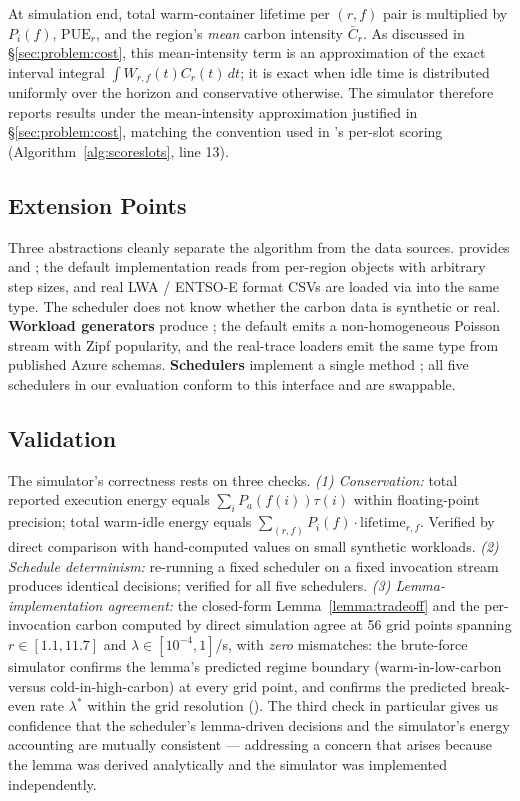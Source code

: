 At simulation end, total warm-container lifetime per $(r, f)$ pair
is multiplied by $P_i(f)$, $\mathrm{PUE}_r$, and the region's
\emph{mean} carbon intensity $\bar{C}_r$. As discussed in
\S\ref{sec:problem:cost}, this mean-intensity term is an
approximation of the exact interval integral
$\int W_{r,f}(t) C_r(t)\,dt$; it is exact when idle time is
distributed uniformly over the horizon and conservative otherwise.
The simulator therefore reports results under the mean-intensity
approximation justified in \S\ref{sec:problem:cost}, matching the
convention used in \GreenFaaS's per-slot scoring
(Algorithm~\ref{alg:scoreslots}, line 13).

\subsection{Extension Points}

Three abstractions cleanly separate the algorithm from the data
sources. \textbf{} provides
 and ;
the default implementation reads from per-region 
objects with arbitrary step sizes, and real LWA / ENTSO-E format CSVs
\citep{lwa} are loaded via  into the same type.
The scheduler does not know whether the carbon data is synthetic or real.
\textbf{Workload generators} produce ; the
default emits a non-homogeneous Poisson stream with Zipf
popularity, and the real-trace loaders emit the same type from
published Azure schemas. \textbf{Schedulers} implement a single
method ;
all five schedulers in our evaluation conform to this interface and
are swappable.

\subsection{Validation}

The simulator's correctness rests on three checks. \emph{(1)
Conservation:} total reported execution energy equals
$\sum_i P_a(f(i)) \tau(i)$ within floating-point precision; total
warm-idle energy equals $\sum_{(r,f)} P_i(f) \cdot
\mathrm{lifetime}_{r,f}$. Verified by direct comparison with
hand-computed values on small synthetic workloads. \emph{(2) Schedule
determinism:} re-running a fixed scheduler on a fixed invocation
stream produces identical decisions; verified for all five
schedulers. \emph{(3) Lemma-implementation agreement:} the
closed-form Lemma~\ref{lemma:tradeoff} and the per-invocation carbon
computed by direct simulation agree at 56 grid points spanning
$r \in [1.1, 11.7]$ and $\lambda \in [10^{-4}, 1]$/s, with
\emph{zero} mismatches: the brute-force simulator confirms the
lemma's predicted regime boundary (warm-in-low-carbon versus
cold-in-high-carbon) at every grid point, and confirms the predicted
break-even rate $\lambda^*$ within the grid resolution
(). The third check
in particular gives us confidence that the scheduler's lemma-driven
decisions and the simulator's energy accounting are mutually
consistent --- addressing a concern that arises because the lemma was derived analytically
and the simulator was implemented independently.
